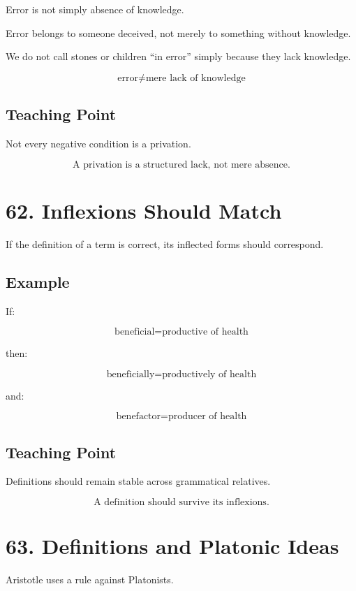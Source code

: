 \documentclass[12pt]{article}
\begin{document}
Error is not simply absence of knowledge.

Error belongs to someone deceived, not merely to something without knowledge.

We do not call stones or children ``in error'' simply because they lack
knowledge.

\[
\text{error} \neq \text{mere lack of knowledge}
\]

\subsection*{Teaching Point}

Not every negative condition is a privation.

\[
\boxed{
\text{A privation is a structured lack, not mere absence.}
}
\]

\section*{62. Inflexions Should Match}

If the definition of a term is correct, its inflected forms should correspond.

\subsection*{Example}

If:

\[
\text{beneficial} = \text{productive of health}
\]

then:

\[
\text{beneficially} = \text{productively of health}
\]

and:

\[
\text{benefactor} = \text{producer of health}
\]

\subsection*{Teaching Point}

Definitions should remain stable across grammatical relatives.

\[
\boxed{
\text{A definition should survive its inflexions.}
}
\]

\section*{63. Definitions and Platonic Ideas}

Aristotle uses a rule against Platonists.
\end{document}
